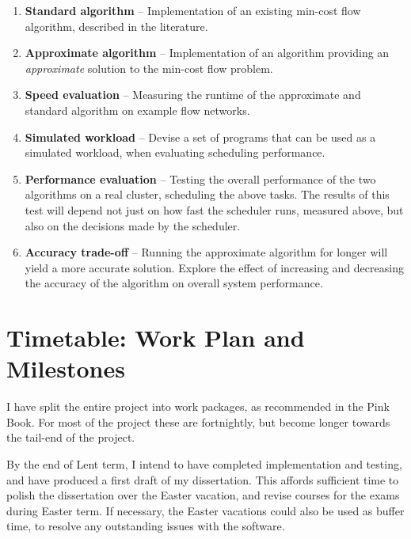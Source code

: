 \begin{enumerate}
  \item \textbf{Standard algorithm} -- Implementation of an existing min-cost flow algorithm, described in the literature.
  \item \textbf{Approximate algorithm} -- Implementation of an algorithm providing an \emph{approximate} solution to the min-cost flow problem.
  \item \textbf{Speed evaluation} -- Measuring the runtime of the approximate and standard algorithm on example flow networks.
  \item \textbf{Simulated workload} -- Devise a set of programs that can be used as a simulated workload, when evaluating scheduling performance.
  \item \textbf{Performance evaluation} -- Testing the overall performance of the two algorithms on a real cluster, scheduling the above tasks. The results of this test will depend not just on how fast the scheduler runs, measured above, but also on the decisions made by the scheduler.
  \item \textbf{Accuracy trade-off} -- Running the approximate algorithm for longer will yield a more accurate solution. Explore the effect of increasing and decreasing the accuracy of the algorithm on overall system performance.
\end{enumerate}

\section*{Timetable: Work Plan and Milestones}

I have split the entire project into work packages, as recommended in the Pink Book. For most of the project these are fortnightly, but become longer towards the tail-end of the project.

By the end of Lent term, I intend to have completed implementation and testing, and have produced a first draft of my dissertation. This affords sufficient time to polish the dissertation over the Easter vacation, and revise courses for the exams during Easter term. If necessary, the Easter vacations could also be used as buffer time, to resolve any outstanding issues with the software. 

\newcommand{\workpackage}[3]{\item \textbf{#1} #2 #3}
\newcommand{\milestone}[1]{\textbf{Milestone:} #1}
\newcommand{\wpstartfill}[0]{\hfill \\ \\}
\newcommand{\wpendfill}[0]{\hfill \\}


